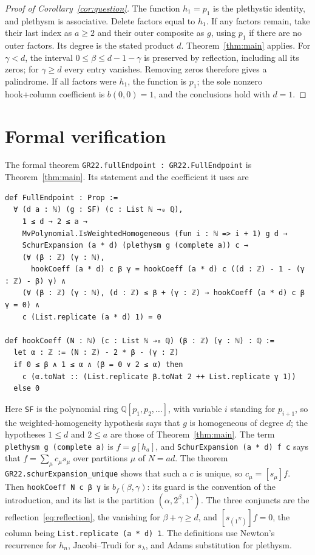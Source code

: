 \documentclass[11pt]{article}
\newcommand{\Q}{\mathbb{Q}}
\begin{document}
\begin{proof}[Proof of Corollary~\ref{cor:question}]
The function $h_1=p_1$ is the plethystic identity, and plethysm is associative. Delete factors equal to $h_1$. If any factors remain, take their last index as $a\geq2$ and their outer composite as $g$, using $p_1$ if there are no outer factors. Its degree is the stated product $d$. Theorem~\ref{thm:main} applies. For $\gamma<d$, the interval $0\leq\beta\leq d-1-\gamma$ is preserved by reflection, including all its zeros; for $\gamma\geq d$ every entry vanishes. Removing zeros therefore gives a palindrome. If all factors were $h_1$, the function is $p_1$; the sole nonzero hook+column coefficient is $b(0,0)=1$, and the conclusions hold with $d=1$.
\end{proof}

\section{Formal verification}
The formal theorem \texttt{GR22.fullEndpoint : GR22.FullEndpoint} is Theorem~\ref{thm:main}. Its statement and the coefficient it uses are
{\small
\begin{verbatim}
def FullEndpoint : Prop :=
  ∀ (d a : ℕ) (g : SF) (c : List ℕ →₀ ℚ),
    1 ≤ d → 2 ≤ a →
    MvPolynomial.IsWeightedHomogeneous (fun i : ℕ => i + 1) g d →
    SchurExpansion (a * d) (plethysm g (complete a)) c →
    (∀ (β : ℤ) (γ : ℕ),
      hookCoeff (a * d) c β γ = hookCoeff (a * d) c ((d : ℤ) - 1 - (γ : ℤ) - β) γ) ∧
    (∀ (β : ℤ) (γ : ℕ), (d : ℤ) ≤ β + (γ : ℤ) → hookCoeff (a * d) c β γ = 0) ∧
    c (List.replicate (a * d) 1) = 0

def hookCoeff (N : ℕ) (c : List ℕ →₀ ℚ) (β : ℤ) (γ : ℕ) : ℚ :=
  let α : ℤ := (N : ℤ) - 2 * β - (γ : ℤ)
  if 0 ≤ β ∧ 1 ≤ α ∧ (β = 0 ∨ 2 ≤ α) then
    c (α.toNat :: (List.replicate β.toNat 2 ++ List.replicate γ 1))
  else 0
\end{verbatim}
}
\noindent Here \texttt{SF} is the polynomial ring $\Q[p_1,p_2,\ldots]$, with variable $i$ standing for $p_{i+1}$, so the weighted-homogeneity hypothesis says that $g$ is homogeneous of degree $d$; the hypotheses $1\leq d$ and $2\leq a$ are those of Theorem~\ref{thm:main}. The term \texttt{plethysm g (complete a)} is $f=g[h_a]$, and \texttt{SchurExpansion (a * d) f c} says that $f=\sum_\mu c_\mu s_\mu$ over partitions $\mu$ of $N=ad$. The theorem \texttt{GR22.schurExpansion\_unique} shows that such a $c$ is unique, so $c_\mu=[s_\mu]f$. Then \texttt{hookCoeff N c β γ} is $b_f(\beta,\gamma)$: its guard is the convention of the introduction, and its list is the partition $(\alpha,2^\beta,1^\gamma)$. The three conjuncts are the reflection~\eqref{eq:reflection}, the vanishing for $\beta+\gamma\geq d$, and $[s_{(1^N)}]f=0$, the column being \texttt{List.replicate (a * d) 1}. The definitions use Newton's recurrence for $h_n$, Jacobi--Trudi for $s_\lambda$, and Adams substitution for plethysm.
\end{document}
